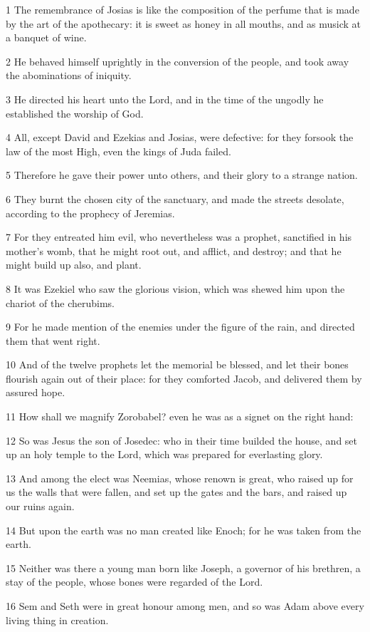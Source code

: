 \par 1 The remembrance of Josias is like the composition of the perfume that is made by the art of the apothecary: it is sweet as honey in all mouths, and as musick at a banquet of wine.
\par 2 He behaved himself uprightly in the conversion of the people, and took away the abominations of iniquity.
\par 3 He directed his heart unto the Lord, and in the time of the ungodly he established the worship of God.
\par 4 All, except David and Ezekias and Josias, were defective: for they forsook the law of the most High, even the kings of Juda failed.
\par 5 Therefore he gave their power unto others, and their glory to a strange nation.
\par 6 They burnt the chosen city of the sanctuary, and made the streets desolate, according to the prophecy of Jeremias.
\par 7 For they entreated him evil, who nevertheless was a prophet, sanctified in his mother's womb, that he might root out, and afflict, and destroy; and that he might build up also, and plant.
\par 8 It was Ezekiel who saw the glorious vision, which was shewed him upon the chariot of the cherubims.
\par 9 For he made mention of the enemies under the figure of the rain, and directed them that went right.
\par 10 And of the twelve prophets let the memorial be blessed, and let their bones flourish again out of their place: for they comforted Jacob, and delivered them by assured hope.
\par 11 How shall we magnify Zorobabel? even he was as a signet on the right hand:
\par 12 So was Jesus the son of Josedec: who in their time builded the house, and set up an holy temple to the Lord, which was prepared for everlasting glory.
\par 13 And among the elect was Neemias, whose renown is great, who raised up for us the walls that were fallen, and set up the gates and the bars, and raised up our ruins again.
\par 14 But upon the earth was no man created like Enoch; for he was taken from the earth.
\par 15 Neither was there a young man born like Joseph, a governor of his brethren, a stay of the people, whose bones were regarded of the Lord.
\par 16 Sem and Seth were in great honour among men, and so was Adam above every living thing in creation.

